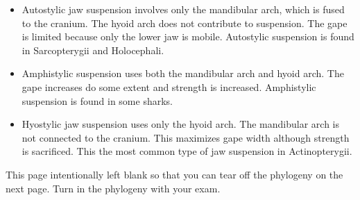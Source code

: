 \documentclass[11pt, addpoints]{exam}
\begin{document}
\begin{questions}
\begin{solution}
	\begin{itemize}
		\item Autostylic jaw suspension involves only the mandibular arch, which is fused to the cranium. The hyoid arch does not contribute to suspension. The gape is limited because only the lower jaw is mobile. Autostylic suspension is found in Sarcopterygii and Holocephali.
		\item Amphistylic suspension uses both the mandibular arch and hyoid arch. The gape increases do some extent and strength is increased. Amphistylic suspension is found in some sharks.
		\item Hyostylic jaw suspension uses only the hyoid arch. The mandibular arch is not connected to the cranium. This maximizes gape width although strength is sacrificed. This the most common type of jaw suspension in Actinopterygii.
	\end{itemize}
\end{solution}

%
%
%
%
\end{questions}


\newpage

\noindent This page intentionally left blank so that you can tear off the phylogeny on the next page. Turn in the phylogeny with your exam.

\newpage


\end{document}
